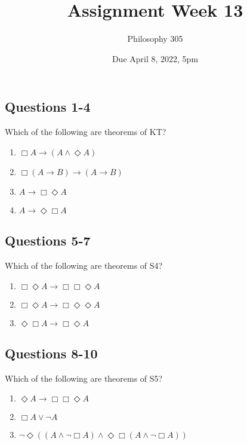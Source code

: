 \documentclass[
  11pt,
]{article}
\title{Assignment Week 13}
\author{Philosophy 305}
\date{Due April 8, 2022, 5pm}
\providecommand{\tightlist}{%
  \setlength{\itemsep}{0pt}\setlength{\parskip}{0pt}}
\begin{document}
\maketitle

\hypertarget{questions-1-4}{%
\subsection{Questions 1-4}\label{questions-1-4}}

Which of the following are theorems of KT?

\begin{enumerate}
\def\labelenumi{\arabic{enumi}.}
\tightlist
\item
  \(\Box A \rightarrow (A \wedge \Diamond A)\)
\item
  \(\Box (A \rightarrow B) \rightarrow (A \rightarrow B)\)
\item
  \(A \rightarrow \Box \Diamond A\)
\item
  \(A \rightarrow \Diamond \Box A\)
\end{enumerate}

\hypertarget{questions-5-7}{%
\subsection{Questions 5-7}\label{questions-5-7}}

Which of the following are theorems of S4?

\begin{enumerate}
\def\labelenumi{\arabic{enumi}.}
\setcounter{enumi}{4}
\tightlist
\item
  \(\Box \Diamond A \rightarrow \Box \Box \Diamond A\)
\item
  \(\Box \Diamond A \rightarrow \Box \Diamond \Diamond A\)
\item
  \(\Diamond \Box A \rightarrow \Box \Diamond A\)
\end{enumerate}

\hypertarget{questions-8-10}{%
\subsection{Questions 8-10}\label{questions-8-10}}

Which of the following are theorems of S5?

\begin{enumerate}
\def\labelenumi{\arabic{enumi}.}
\setcounter{enumi}{7}
\tightlist
\item
  \(\Diamond A \rightarrow \Box \Box \Diamond A\)
\item
  \(\Box A \vee \neg A\)
\item
  \(\neg \Diamond ((A \wedge \neg \Box A) \wedge \Diamond \Box (A \wedge \neg \Box A))\)
\end{enumerate}
\end{document}
